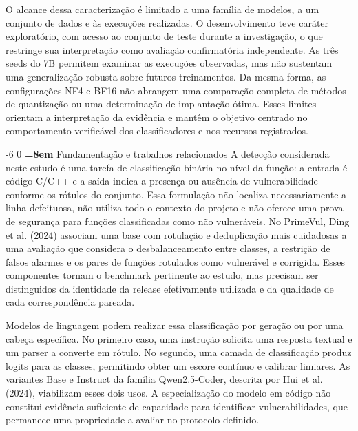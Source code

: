 \documentclass[12pt,a4paper]{article}
\makeatletter
\newcommand{\XIIIPT}{\@setfontsize\xiiipt{13}{17}}
\renewcommand\section{\@startsection{section}{1}{\z@}%
                       {-6\p@ \@plus -4\p@ \@minus -4\p@}%
                       {0\p@ \@plus 4\p@ \@minus 4\p@}%
                       {\normalfont\XIIIPT\bfseries\boldmath
                        \rightskip=\z@ \@plus 8em\pretolerance=10000 }}
\makeatother
\begin{document}
O alcance dessa caracterização é limitado a uma família de modelos, a um conjunto de dados e às execuções realizadas. O desenvolvimento teve caráter exploratório, com acesso ao conjunto de teste durante a investigação, o que restringe sua interpretação como avaliação confirmatória independente. As três seeds do 7B permitem examinar as execuções observadas, mas não sustentam uma generalização robusta sobre futuros treinamentos. Da mesma forma, as configurações NF4 e BF16 não abrangem uma comparação completa de métodos de quantização ou uma determinação de implantação ótima. Esses limites orientam a interpretação da evidência e mantêm o objetivo centrado no comportamento verificável dos classificadores e nos recursos registrados.

\section{Fundamentação e trabalhos relacionados}
A detecção considerada neste estudo é uma tarefa de classificação binária no nível da função: a entrada é código C/C++ e a saída indica a presença ou ausência de vulnerabilidade conforme os rótulos do conjunto. Essa formulação não localiza necessariamente a linha defeituosa, não utiliza todo o contexto do projeto e não oferece uma prova de segurança para funções classificadas como não vulneráveis. No PrimeVul, Ding et al. (2024) associam uma base com rotulação e deduplicação mais cuidadosas a uma avaliação que considera o desbalanceamento entre classes, a restrição de falsos alarmes e os pares de funções rotulados como vulnerável e corrigida. Esses componentes tornam o benchmark pertinente ao estudo, mas precisam ser distinguidos da identidade da release efetivamente utilizada e da qualidade de cada correspondência pareada.

Modelos de linguagem podem realizar essa classificação por geração ou por uma cabeça específica. No primeiro caso, uma instrução solicita uma resposta textual e um parser a converte em rótulo. No segundo, uma camada de classificação produz logits para as classes, permitindo obter um escore contínuo e calibrar limiares. As variantes Base e Instruct da família Qwen2.5-Coder, descrita por Hui et al. (2024), viabilizam esses dois usos. A especialização do modelo em código não constitui evidência suficiente de capacidade para identificar vulnerabilidades, que permanece uma propriedade a avaliar no protocolo definido.
\end{document}
